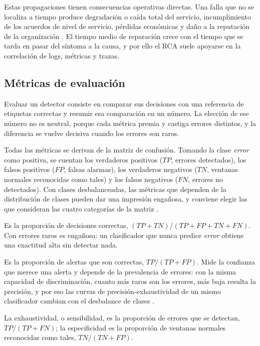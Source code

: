 Estas propagaciones tienen consecuencias operativas directas. Una falla que no se localiza a tiempo produce degradación o caída total del servicio, incumplimiento de los acuerdos de nivel de servicio, pérdidas económicas y daño a la reputación de la organización \cite{wang2024_rca}. El tiempo medio de reparación crece con el tiempo que se tarda en pasar del síntoma a la causa, y por ello el RCA suele apoyarse en la correlación de logs, métricas y trazas.

\subsection{Métricas de evaluación}\label{sec:mt_metricas}

Evaluar un detector consiste en comparar sus decisiones con una referencia de etiquetas correctas y resumir esa comparación en un número. La elección de ese número no es neutral, porque cada métrica premia y castiga errores distintos, y la diferencia se vuelve decisiva cuando los errores son raros.

Todas las métricas se derivan de la matriz de confusión. Tomando la clase \emph{error} como positiva, se cuentan los verdaderos positivos ($TP$, errores detectados), los falsos positivos ($FP$, falsas alarmas), los verdaderos negativos ($TN$, ventanas normales reconocidas como tales) y los falsos negativos ($FN$, errores no detectados). Con clases desbalanceadas, las métricas que dependen de la distribución de clases pueden dar una impresión engañosa, y conviene elegir las que consideran las cuatro categorías de la matriz \cite{diallo2025_metrics}.

Es la proporción de decisiones correctas, $(TP + TN)/(TP + FP + TN + FN)$. Con errores raros es engañosa: un clasificador que nunca predice \emph{error} obtiene una exactitud alta sin detectar nada.

Es la proporción de alertas que son correctas, $TP/(TP + FP)$. Mide la confianza que merece una alerta y depende de la prevalencia de errores: con la misma capacidad de discriminación, cuanto más raros son los errores, más baja resulta la precisión, y por eso las curvas de precisión-exhaustividad de un mismo clasificador cambian con el desbalance de clases \cite{richardson2024_roc}.

La exhaustividad, o sensibilidad, es la proporción de errores que se detectan, $TP/(TP + FN)$; la especificidad es la proporción de ventanas normales reconocidas como tales, $TN/(TN + FP)$.

